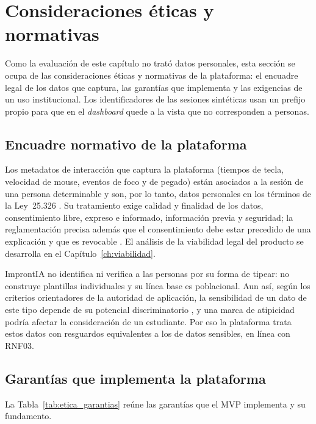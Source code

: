 \section{Consideraciones éticas y normativas}
\label{sec:eval_etica}

Como la evaluación de este capítulo no trató datos personales, esta sección se ocupa de las consideraciones éticas y normativas de la plataforma: el encuadre legal de los datos que captura, las garantías que implementa y las exigencias de un uso institucional. Los identificadores de las sesiones sintéticas usan un prefijo propio para que en el \textit{dashboard} quede a la vista que no corresponden a personas.

\subsection{Encuadre normativo de la plataforma}

Los metadatos de interacción que captura la plataforma (tiempos de tecla, velocidad de mouse, eventos de foco y de pegado) están asociados a la sesión de una persona determinable y son, por lo tanto, datos personales en los términos de la Ley~25.326 \parencite{Argentina2000Ley25326}. Su tratamiento exige calidad y finalidad de los datos, consentimiento libre, expreso e informado, información previa y seguridad; la reglamentación precisa además que el consentimiento debe estar precedido de una explicación y que es revocable \parencite{Argentina2001Dec1558}. El análisis de la viabilidad legal del producto se desarrolla en el Capítulo~\ref{ch:viabilidad}.

ImprontIA no identifica ni verifica a las personas por su forma de tipear: no construye plantillas individuales y su línea base es poblacional. Aun así, según los criterios orientadores de la autoridad de aplicación, la sensibilidad de un dato de este tipo depende de su potencial discriminatorio \parencite{AAIP2019Res4}, y una marca de atipicidad podría afectar la consideración de un estudiante. Por eso la plataforma trata estos datos con resguardos equivalentes a los de datos sensibles, en línea con RNF03.

\subsection{Garantías que implementa la plataforma}

La Tabla~\ref{tab:etica_garantias} reúne las garantías que el MVP implementa y su fundamento.

